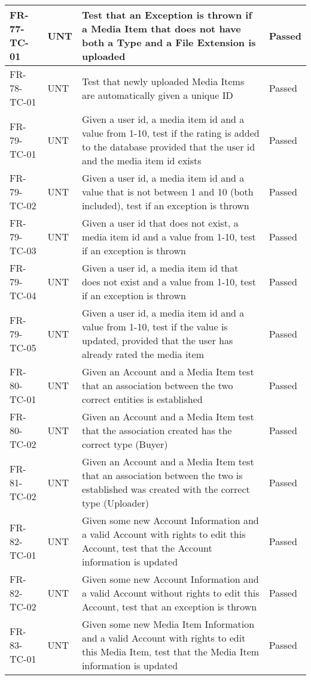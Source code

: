 \documentclass[../report.tex]{subfiles}
\begin{document}
\begin{longtable}{|L{2.1cm}|L{1cm}|L{12.4cm}|L{1.4cm}|}
FR-77-TC-01&UNT&Test that an Exception is thrown if a Media Item that does not have both a Type and a File Extension is uploaded&Passed  \\ \hline
FR-78-TC-01&UNT&Test that newly uploaded Media Items are automatically given a unique ID&Passed  \\ \hline
FR-79-TC-01&UNT&Given a user id, a media item id and a value from 1-10, test if the rating is added to the database provided that the user id and the media item id exists&Passed  \\ \hline
FR-79-TC-02&UNT&Given a user id, a media item id and a value that is not between 1 and 10 (both included), test if an exception is thrown&Passed  \\ \hline
FR-79-TC-03&UNT&Given a user id that does not exist, a media item id and a value from 1-10, test if an exception is thrown&Passed  \\ \hline
FR-79-TC-04&UNT&Given a user id, a media item id that does not exist and a value from 1-10, test if an exception is thrown&Passed  \\ \hline
FR-79-TC-05&UNT&Given a user id, a media item id and a value from 1-10, test if the value is updated, provided that the user has already rated the media item&Passed  \\ \hline
FR-80-TC-01&UNT&Given an Account and a Media Item test that an association between the two correct entities is established &Passed  \\ \hline
FR-80-TC-02&UNT&Given an Account and a Media Item test that the association created has the correct type (Buyer)&Passed  \\ \hline
FR-81-TC-02&UNT&Given an Account and a Media Item test that an association between the two is established was created with the correct type (Uploader)&Passed  \\ \hline
FR-82-TC-01&UNT&Given some new Account Information and a valid Account with rights to edit this Account, test that the Account information is updated&Passed  \\ \hline
FR-82-TC-02&UNT&Given some new Account Information and a valid Account without rights to edit this Account, test that an exception is thrown&Passed  \\ \hline
FR-83-TC-01&UNT&Given some new Media Item Information and a valid Account with rights to edit this Media Item, test that the Media Item information is updated&Passed  \\ \hline

\end{longtable}
\end{document}
